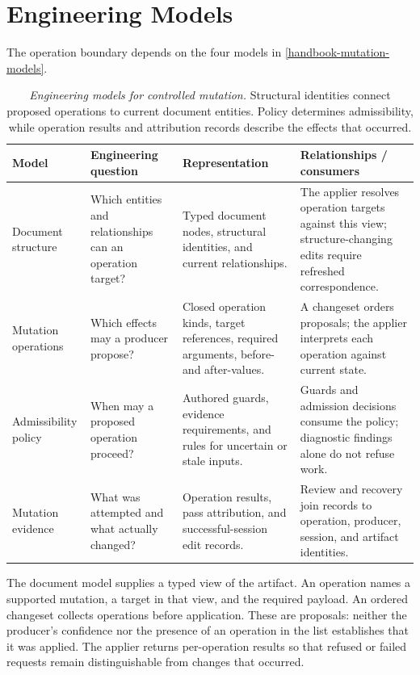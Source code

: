 \section{Engineering Models}\label{heading:handbook-model-document-changeset}

The operation boundary depends on the four models in \autoref{handbook-mutation-models}.

{\footnotesize
\begin{longtable}{@{}p{.18\linewidth}p{.22\linewidth}p{.25\linewidth}p{.27\linewidth}@{}}
\caption[Engineering models for controlled mutation]{\emph{Engineering models for controlled mutation.} Structural identities connect proposed operations to current document entities. Policy determines admissibility, while operation results and attribution records describe the effects that occurred.}\label{handbook-mutation-models}\\
\toprule
\textbf{Model} & \textbf{Engineering question} & \textbf{Representation} & \textbf{Relationships / consumers} \\
\midrule\endhead
Document structure & Which entities and relationships can an operation target? & Typed document nodes, structural identities, and current relationships. & The applier resolves operation targets against this view; structure-changing edits require refreshed correspondence. \\
Mutation operations & Which effects may a producer propose? & Closed operation kinds, target references, required arguments, before- and after-values. & A changeset orders proposals; the applier interprets each operation against current state. \\
Admissibility policy & When may a proposed operation proceed? & Authored guards, evidence requirements, and rules for uncertain or stale inputs. & Guards and admission decisions consume the policy; diagnostic findings alone do not refuse work. \\
Mutation evidence & What was attempted and what actually changed? & Operation results, pass attribution, and successful-session edit records. & Review and recovery join records to operation, producer, session, and artifact identities. \\
\bottomrule\end{longtable}
}

The document model supplies a typed view of the artifact. An operation names a supported mutation, a target in that view, and the required payload. An ordered changeset collects operations before application. These are proposals: neither the producer's confidence nor the presence of an operation in the list establishes that it was applied. The applier returns per-operation results so that refused or failed requests remain distinguishable from changes that occurred.

